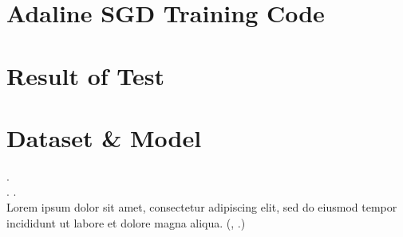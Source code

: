 


\chapter{Adaline SGD Training Code}
\chapter{Result of Test}
\chapter{Dataset \& Model}
	\lipsum[1]. \cite{ahadjitse2013reconnaissance} \\
	\lipsum[3]
	\cite{deepa2021ai}.
	\cite{bottou2012stochastic}.
	\cite{framling2004scaled}\\
	
	Lorem ipsum dolor sit amet, consectetur adipiscing elit, sed do eiusmod tempor incididunt ut labore et dolore magna aliqua. (\eg, \cite{lydia2019adagrad} \cite{netrapalli2019stochastic} \cite{caruana2006empirical}.)



